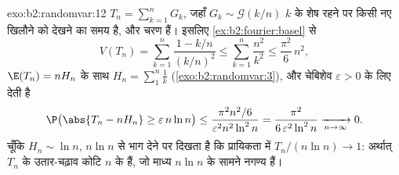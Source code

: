 \begin{solution}{exo:b2:randomvar:12}
$T_n = \sum_{k=1}^nG_k$, जहाँ $G_k \sim \mathcal G(k/n)$ $k$ के शेष रहने पर किसी नए खिलौने को देखने का समय
है, और चरण  हैं। इसलिए \cref{ex:b2:fourier:basel} से
\[
V(T_n) = \sum_{k=1}^n\frac{1 - k/n}{(k/n)^2}
\leq \sum_{k=1}^n\frac{n^2}{k^2}
\leq \frac{\pi^2}6\,n^2 ,
\]
$\E(T_n) = nH_n$ के साथ $H_n =
\sum_1^n\frac1k$ (\cref{exo:b2:randomvar:3}), और चेबिशेव $\varepsilon > 0$ के लिए देती है
\[
\P\bigl(\abs{T_n - nH_n} \geq \varepsilon\,n\ln n\bigr)
\leq \frac{\pi^2n^2/6}{\varepsilon^2n^2\ln^2 n}
= \frac{\pi^2}{6\,\varepsilon^2\ln^2n}
\xrightarrow[n\to\infty]{} 0 .
\]
चूँकि $H_n \sim \ln n$, $n\ln n$ से भाग देने पर दिखता है कि प्रायिकता में $T_n/(n\ln n) \to 1$:
अर्थात् $T_n$ के उतार-चढ़ाव कोटि $n$ के हैं, जो माध्य $n\ln n$ के सामने
नगण्य हैं।
\end{solution}

